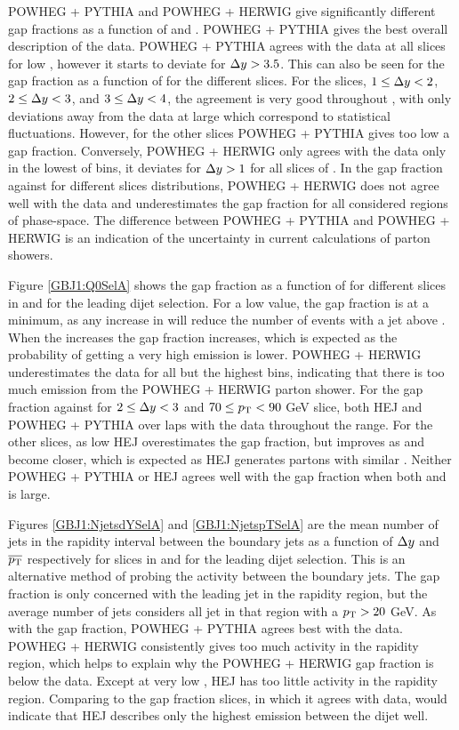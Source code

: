 POWHEG + PYTHIA and POWHEG + HERWIG give significantly different gap fractions as a function of \dy{} and \ptb{}.
POWHEG + PYTHIA gives the best overall description of the data.
POWHEG + PYTHIA agrees with the data at all \ptb{} slices for low \dy{}, however it starts to deviate for $\mbox{$\Delta y$}{}>3.5$. 
This can also be seen for the gap fraction as a function of \ptb{} for the different \dy{} slices. 
For the slices, $1\le\mbox{$\Delta y$}{}<2$, $2\le\mbox{$\Delta y$}{}<3$, and $3\le\mbox{$\Delta y$}{}<4$, the agreement is very good throughout \ptb{}, with only deviations away from the data at large \dy{} which correspond to statistical fluctuations.
However, for the other \dy{} slices POWHEG + PYTHIA gives too low a gap fraction.
Conversely, POWHEG + HERWIG only agrees with the data only in the lowest of \dy{} bins, it deviates for $\mbox{$\Delta y$}{}>1$ for all slices of \ptb{}. 
In the gap fraction against \ptb{} for different \dy{} slices distributions, POWHEG + HERWIG does not agree well with the data and underestimates the gap fraction for all considered regions of phase-space.
The difference between POWHEG + PYTHIA and POWHEG + HERWIG is an indication of the uncertainty in current calculations of parton showers.


Figure \ref{GBJ1:Q0SelA} shows the gap fraction as a function of \qz{} for different slices in \dy{} and \ptb{} for the leading \pt{} dijet selection.
For a low \qz{} value, the gap fraction is at a minimum, as any increase in \qz{} will reduce the number of events with a jet above \qz{}.
When the \qz{} increases the gap fraction increases, which is expected as the probability of getting a very high \pt{} emission is lower.
POWHEG + HERWIG underestimates the data for all but the highest \qz{} bins, indicating that there is too much emission from the POWHEG + HERWIG parton shower. 
For the gap fraction against \qz{} for $2\le\mbox{$\Delta y$}{}<3$ and  $70\le\mbox{$p_{\rm T}$}{}<90$ GeV slice, both HEJ and POWHEG + PYTHIA over laps with the data throughout the \qz{} range. 
For the other slices, as low \qz{} HEJ overestimates the gap fraction, but improves as \qz{} and \ptb{} become closer, which is expected as HEJ generates partons with similar \pt{}.
Neither POWHEG + PYTHIA or HEJ agrees well with the gap fraction when both \dy{} and \qz{} is large.



Figures \ref{GBJ1:NjetsdYSelA} and \ref{GBJ1:NjetspTSelA} are the mean number of jets in the rapidity interval between the boundary jets as a function of $\mbox{$\Delta y$}{}$ and $\mbox{$\overline{p_{\rm T}}$}{}$ respectively for slices in \ptb{} and \dy{} for the leading \pt{} dijet selection. 
This is an alternative method of probing the activity between the boundary jets. 
The gap fraction is only concerned with the leading jet in the rapidity region, but the average number of jets considers all jet in that region with a $\mbox{$p_{\rm T}$}{}>20$ GeV. 
As with the gap fraction, POWHEG + PYTHIA agrees best with the data.
POWHEG + HERWIG consistently gives too much activity in the rapidity region, which helps to explain why the POWHEG + HERWIG gap fraction is below the data.
Except at very low \ptb{}, HEJ has too little activity in the rapidity region.
Comparing to the gap fraction slices, in which it agrees with data, would indicate that HEJ describes only the highest \pt{} emission between the dijet well. 

